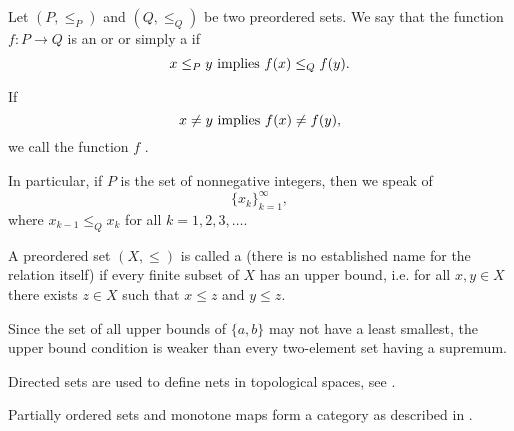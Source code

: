 \begin{definition}\label{def:monotone_map}
  Let \( (P, \leq_P) \) and \( (Q, \leq_Q) \) be two preordered sets. We say that the function \( f: P \to Q \) is an  or  or simply a  if
  \begin{equation*}
    x \leq_P y \text{ implies } f(x) \leq_Q f(y).
  \end{equation*}

  If
  \begin{equation*}
    x \neq y \text{ implies } f(x) \neq f(y),
  \end{equation*}
  we call the function \( f \) .

  In particular, if \( P \) is the set of nonnegative integers, then we speak of 
  \begin{equation*}
    \{ x_k \}_{k=1}^\infty,
  \end{equation*}
  where \( x_{k-1} \leq_Q x_k \) for all \( k = 1, 2, 3, \ldots \).
\end{definition}

\begin{definition}\label{def:directed_set}\cite[8]{Engelking1989}
  A preordered set \( (X, \leq) \) is called a  (there is no established name for the relation itself) if every finite subset of \( X \) has an upper bound, i.e. for all \( x, y \in X \) there exists \( z \in X \) such that \( x \leq z \) and \( y \leq z \).

  Since the set of all upper bounds of \( \{ a, b \} \) may not have a least smallest, the upper bound condition is weaker than every two-element set having a supremum.

  Directed sets are used to define nets in topological spaces, see .
\end{definition}

\begin{definition}\label{def:category_of_preordered_sets}
  Partially ordered sets and monotone maps form a category as described in .
\end{definition}
